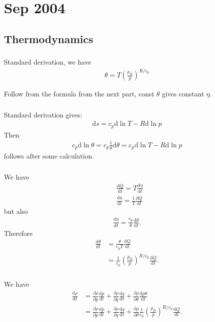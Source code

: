 \documentclass[11pt,letterpaper]{book}
\theoremstyle{definition}
\newcommand{\de}{\mathrm{d}}
\newcommand{\pe}{\partial}
\begin{document}
\chapter{Sep 2004}
\section{Thermodynamics}
\subsection{}
Standard derivation, we have
\begin{align*}
    \theta = T\left(\frac{p_R}{p}\right)^{R/c_p}
\end{align*}

Follow from the formula from the next part, const $\theta$ gives constant $\eta$.

\subsection{}
Standard derivation gives:
\begin{align*}
    \de s = c_p\de\ln T-R\de\ln p
\end{align*}
Then
\begin{align*}
    c_p\de\ln\theta = c_p\frac{1}{\theta}\de\theta = c_p\de\ln T-R\de\ln p
\end{align*}
follows after some calculation.

\subsection{}
We have
\begin{align*}
    &\frac{\de Q}{\de t} = T\frac{\de \eta}{\de t}\\
    &\frac{\de \eta}{\de t} = \frac{1}{T}\frac{\de Q}{\de t}
\end{align*}
but also
\begin{align*}
    \frac{\de \eta}{\de t} = \frac{c_p}{\theta}\frac{\de\theta}{\de t}.
\end{align*}
Therefore
\begin{align*}
    \frac{\de\theta}{\de t} &= \frac{\theta}{c_p T}\frac{\de Q}{\de t}\\
    &= \frac{1}{c_p}\left(\frac{p_R}{p}\right)^{R/c_p}\frac{\de Q}{\de t}.
\end{align*}

\subsection{}
We have
\begin{align*}
    \frac{\de\rho}{\de t} &= \frac{\pe\rho}{\pe p}\frac{\de p}{\de t}+\frac{\pe\rho}{\pe q}\frac{\de q}{\de t}+\frac{\pe\rho}{\pe \theta}\frac{\de p\theta}{\de t}\\
    &= \frac{\pe\rho}{\pe p}\frac{\de p}{\de t}+\frac{\pe\rho}{\pe q}\frac{\de q}{\de t}+\frac{\pe\rho}{\pe \theta}\frac{1}{c_p}\left(\frac{p_R}{p}\right)^{R/c_p}\frac{\de Q}{\de t}.
\end{align*}
\end{document}
